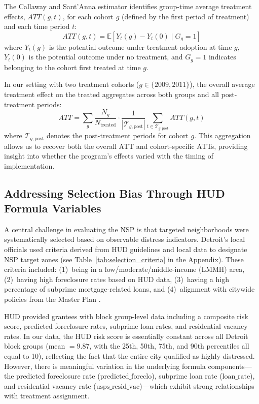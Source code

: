 \documentclass[12pt,authoryear]{elsarticle}
\begin{document}
The Callaway and Sant'Anna estimator identifies group-time average treatment effects, $ATT(g,t)$, for each cohort $g$ (defined by the first period of treatment) and each time period $t$:
\begin{equation}
ATT(g,t) = \mathbb{E}[Y_t(g) - Y_t(0) \mid G_g = 1]
\label{eq:att_gt}
\end{equation}
where $Y_t(g)$ is the potential outcome under treatment adoption at time $g$, $Y_t(0)$ is the potential outcome under no treatment, and $G_g = 1$ indicates belonging to the cohort first treated at time $g$.

In our setting with two treatment cohorts ($g \in \{2009, 2011\}$), the overall average treatment effect on the treated aggregates across both groups and all post-treatment periods:
\begin{equation}
ATT = \sum_{g} \frac{N_g}{N_{\text{treated}}} \cdot \frac{1}{|\mathcal{T}_{g,\text{post}}|}\sum_{t \in \mathcal{T}_{g,\text{post}}} ATT(g, t)
\label{eq:att_overall}
\end{equation}
where $\mathcal{T}_{g,\text{post}}$ denotes the post-treatment periods for cohort $g$. This aggregation allows us to recover both the overall ATT and cohort-specific ATTs, providing insight into whether the program's effects varied with the timing of implementation.

\subsection{Addressing Selection Bias Through HUD Formula Variables}

A central challenge in evaluating the NSP is that targeted neighborhoods were systematically selected based on observable distress indicators. Detroit's local officials used criteria derived from HUD guidelines and local data to designate NSP target zones (see Table~\ref{tab:selection_criteria} in the Appendix). These criteria included: (1)~being in a low/moderate/middle-income (LMMH) area, (2)~having high foreclosure rates based on HUD data, (3)~having a high percentage of subprime mortgage-related loans, and (4)~alignment with citywide policies from the Master Plan \citep{pdd2009}.

HUD provided grantees with block group-level data including a composite risk score, predicted foreclosure rates, subprime loan rates, and residential vacancy rates. In our data, the HUD risk score is essentially constant across all Detroit block groups (mean $= 9.87$, with the 25th, 50th, 75th, and 90th percentiles all equal to 10), reflecting the fact that the entire city qualified as highly distressed. However, there is meaningful variation in the underlying formula components---the predicted foreclosure rate ($\text{predicted\_foreclo}$), subprime loan rate ($\text{loan\_rate}$), and residential vacancy rate ($\text{usps\_resid\_vac}$)---which exhibit strong relationships with treatment assignment.
\end{document}
